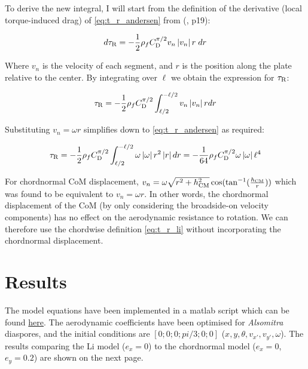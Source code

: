 \documentclass[draft]{jfm} %
\begin{document}
To derive the new integral, I will start from the definition of the derivative (local torque-induced drag) of \ref{eq:t_r_andersen} from (\cite{andersen2005analysis}, p19):

\begin{equation}
d \tau_\textnormal{R} = -\frac{1}{2}\rho_f C_{\textup{D}}^{\pi /2} v_n  \left| v_n \right| r\hspace{1mm}dr\label{eq:t_r_andersen_2}
\end{equation}

Where $v_n$ is the velocity of each segment, and $r$ is the position along the plate relative to the center. By integrating over $\ell$ we obtain the expression for $\tau_\textnormal{R}$:

\begin{equation}
\tau_\textnormal{R} = - \frac{1}{2}\rho_f C_{\textup{D}}^{\pi /2} \int_{\ell/2}^{-\ell/2}  v_n  \left| v_n \right| r dr\label{eq:simplified_tr_integral}
\end{equation} 

Substituting $v_n = \omega r$ simplifies down to \ref{eq:t_r_andersen} as required:

\begin{equation}
\tau_\textnormal{R} = -\frac{1}{2}\rho_f C_{\textup{D}}^{\pi /2} \int_{\ell/2}^{-\ell/2} \omega  \left| \omega \right| r^2 \left| r \right|  dr = -\frac{1}{64}\rho_f C_{\textup{D}}^{\pi /2}  \omega  \left| \omega \right|  \ell^4 
\end{equation}

For chordnormal CoM displacement, $v_n = \omega\sqrt{r^2+h_{\textup{CM}}^2}\cos(\tan^{-1}(\frac{h_{\textup{CM}}}{r}))$ which was found to be equivalent to $v_n = \omega r$. In other words, the chordnormal displacement of the CoM (by only considering the broadside-on velocity components) has no effect on the aerodynamic resistance to rotation. We can therefore use the chordwise definition \ref{eq:t_r_li} without incorporating the chordnormal displacement.

\section{Results}
The model equations have been implemented in a matlab script which can be found \href{https://github.com/ckessler2/phd/blob/main/Chornormal_Li_Model/Run_Li_Model.m}{here}. The aerodynamic coefficients have been optimised for \textit{Alsomitra} diaspores, and the initial conditions are $[0; 0; 0; pi/3; 0; 0]$ ($x,y,\theta,v_{x'},v_{y'},\omega$). The results comparing the Li model ($e_x = 0$) to the chordnormal model ($e_x=0$, $e_y = 0.2$) are shown on the next page.
\end{document}
